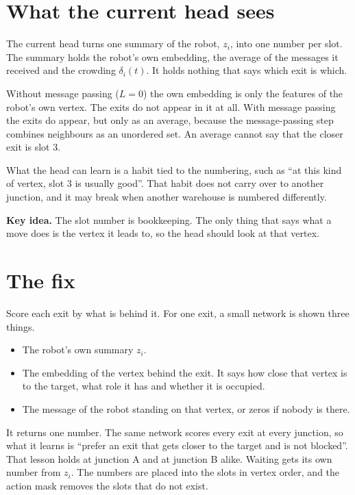 \documentclass[11pt,a4paper]{article}
\newcommand{\idea}[1]{\par\smallskip\noindent\colorbox{boxbg}{\parbox{\dimexpr\linewidth-2\fboxsep}{\textbf{Key idea.} #1}}\par\smallskip}
\begin{document}
\section{What the current head sees}

The current head turns one summary of the robot, $z_i$, into one number per
slot. The summary holds the robot's own embedding, the average of the
messages it received and the crowding $\delta_i(t)$. It holds nothing that
says which exit is which.

Without message passing ($L = 0$) the own embedding is only the features of
the robot's own vertex. The exits do not appear in it at all. With message
passing the exits do appear, but only as an average, because the
message-passing step combines neighbours as an unordered set. An average
cannot say that the closer exit is slot 3.

What the head can learn is a habit tied to the numbering, such as ``at this
kind of vertex, slot 3 is usually good''. That habit does not carry over to
another junction, and it may break when another warehouse is numbered
differently.

\idea{The slot number is bookkeeping. The only thing that says what a move
does is the vertex it leads to, so the head should look at that vertex.}

\section{The fix}
\label{sec:fix}

Score each exit by what is behind it. For one exit, a small network is shown
three things.

\begin{itemize}[leftmargin=1.4em, itemsep=2pt]
  \item The robot's own summary $z_i$.
  \item The embedding of the vertex behind the exit. It says how close that
    vertex is to the target, what role it has and whether it is occupied.
  \item The message of the robot standing on that vertex, or zeros if nobody
    is there.
\end{itemize}

It returns one number. The same network scores every exit at every
junction, so what it learns is ``prefer an exit that gets closer to the
target and is not blocked''. That lesson holds at junction A and at
junction B alike. Waiting gets its own number from $z_i$. The numbers are
placed into the slots in vertex order, and the action mask removes the slots
that do not exist.
\end{document}

